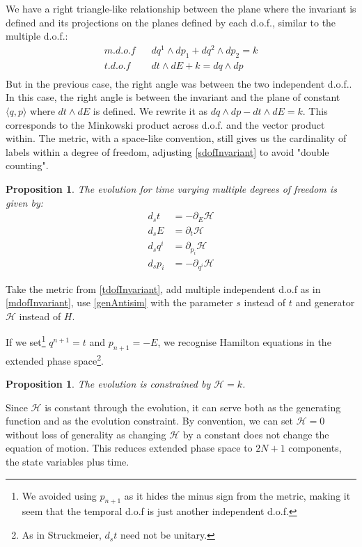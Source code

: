 \documentclass[aps,pra,10pt,twocolumn,floatfix,nofootinbib]{revtex4-1}
\newtheorem{prop}[thm]{Proposition}
\theoremstyle{definition}
\begin{document}
We have a right triangle-like relationship between the plane where the invariant is defined and its projections on the planes defined by each d.o.f., similar to the multiple d.o.f.:
\begin{align*}
m.d.o.f \;\;\; &dq^1 \wedge dp_1 + dq^2 \wedge dp_2 = k \\
t.d.o.f \;\;\; &dt \wedge dE + k = dq \wedge dp \\
\end{align*}
But in the previous case, the right angle was between the two independent d.o.f.. In this case, the right angle is between the invariant and the plane of constant $\langle q, p \rangle$ where $dt \wedge dE$ is defined. We rewrite it as $dq \wedge dp - dt \wedge dE = k$. This corresponds to the Minkowski product across d.o.f. and the vector product within. The metric, with a space-like convention, still gives us the cardinality of labels within a degree of freedom, adjusting \ref{sdofInvariant} to avoid "double counting".

\begin{prop}\label{tdofHam}
The evolution for time varying multiple degrees of freedom is given by:
\begin{align*}
d_{s}t &= - \partial_{E} \mathcal{H} \\
d_{s}E &= \partial_{t} \mathcal{H} \\
d_{s}q^i &= \partial_{p_i} \mathcal{H} \\
d_{s}p_i &= - \partial_{q^i} \mathcal{H}
\end{align*}
\end{prop}

Take the metric from \ref{tdofInvariant}, add multiple independent d.o.f as in \ref{mdofInvariant}, use \ref{genAntisim} with the parameter $s$ instead of $t$ and generator $\mathcal{H}$ instead of $H$.

If we set\footnote{We avoided using $p_{n+1}$ as it hides the minus sign from the metric, making it seem that the temporal d.o.f is just another independent d.o.f.} $q^{n+1}=t$ and $p_{n+1}=-E$, we recognise Hamilton equations in the extended phase space\footnote{As in Struckmeier\cite{Struckmeier}, $d_{s}t$ need not be unitary.}\cite{Synge,Lanczos}.

\begin{prop}\label{tdofConstrain}
The evolution is constrained by $\mathcal{H}=k$.
\end{prop}

Since $\mathcal{H}$ is constant through the evolution, it can serve both as the generating function and as the evolution constraint. By convention, we can set $\mathcal{H}=0$ without loss of generality as changing $\mathcal{H}$ by a constant does not change the equation of motion. This reduces extended phase space to $2N + 1$ components, the state variables plus time.
\end{document}
